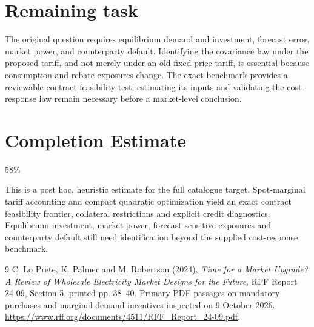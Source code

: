 \documentclass[11pt]{article}
\begin{document}
\section*{Remaining task}
The original question requires equilibrium demand and investment, forecast error, market power, and counterparty default. Identifying the covariance law under the proposed tariff, and not merely under an old fixed-price tariff, is essential because consumption and rebate exposures change. The exact benchmark provides a reviewable contract feasibility test; estimating its inputs and validating the cost-response law remain necessary before a market-level conclusion.

\section{Completion Estimate}
58\%

This is a post hoc, heuristic estimate for the full catalogue target.
Spot-marginal tariff accounting and compact quadratic optimization yield an exact contract feasibility frontier, collateral restrictions and explicit credit diagnostics. Equilibrium investment, market power, forecast-sensitive exposures and counterparty default still need identification beyond the supplied cost-response benchmark.

\begin{thebibliography}{9}
 C. Lo Prete, K. Palmer and M. Robertson (2024), \emph{Time for a Market Upgrade? A Review of Wholesale Electricity Market Designs for the Future}, RFF Report 24-09, Section 5, printed pp. 38--40. Primary PDF passages on mandatory purchases and marginal demand incentives inspected on 9 October 2026. \url{https://www.rff.org/documents/4511/RFF_Report_24-09.pdf}.
\end{thebibliography}
\end{document}
